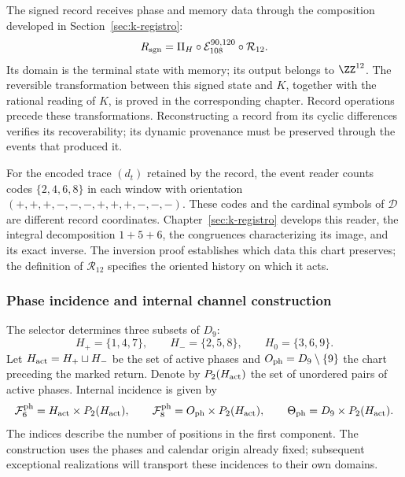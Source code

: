 The signed record receives phase and memory data through the
composition developed in Section~\ref{sec:k-registro}:
\begin{equation}
 R_{\rm sgn}=\Pi_H\circ\mathcal E_{108}^{90,120}
                         \circ\mathcal R_{12}.
 \label{tpk-int:registro-causal}
\end{equation}
Its domain is the terminal state with memory; its output belongs
to \(\ZZ^{12}\). The reversible transformation between this signed
state and \(K\), together with the rational reading of \(K\),
is proved in the corresponding chapter. Record operations precede
these transformations. Reconstructing a record from its cyclic
differences verifies its recoverability; its dynamic provenance
must be preserved through the events that produced it.

For the encoded trace \((d_t)\) retained by the record,
the event reader counts codes \(\{2,4,6,8\}\) in each window
with orientation \((+,+,+,-,-,-,+,+,+,-,-,-)\).
These codes and the cardinal symbols of \(\mathcal D\)
are different record coordinates. Chapter~\ref{sec:k-registro}
develops this reader, the integral decomposition \(1+5+6\),
the congruences characterizing its image, and its exact inverse.
The inversion proof establishes which data this chart preserves;
the definition of \(\mathcal R_{12}\) specifies the oriented
history on which it acts.

\subsubsection{Phase incidence and internal channel construction}
\label{tpk-int:incidencia}

The selector determines three subsets of \(D_9\):
\[
 H_+=\{1,4,7\},\qquad H_-=\{2,5,8\},\qquad H_0=\{3,6,9\}.
\]
Let \(H_{\rm act}=H_+\sqcup H_-\) be the set of active phases
and \(O_{\rm ph}=D_9\setminus\{9\}\) the chart preceding
the marked return. Denote by \(P_2(H_{\rm act})\) the set of
unordered pairs of active phases. Internal incidence is given by
\begin{equation}
 \mathcal F^{\rm ph}_6=H_{\rm act}\times P_2(H_{\rm act}),\qquad
 \mathcal F^{\rm ph}_8=O_{\rm ph}\times P_2(H_{\rm act}),\qquad
 \Theta_{\rm ph}=D_9\times P_2(H_{\rm act}).
 \label{tpk-int:fases90120}
\end{equation}
The indices describe the number of positions in the first component.
The construction uses the phases and calendar origin already fixed;
subsequent exceptional realizations will transport these incidences
to their own domains.

